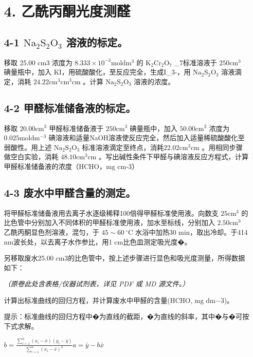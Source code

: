 \section*{4. 乙酰丙酮光度测醛}
\subsection*{4-1 $\mathrm { N a _ { 2 } S _ { 2 } O _ { 3 } }$ 溶液的标定。}

移取 25.00 cm3 浓度为 $8 . 3 3 3 \times 1 0 ^ { - 3 } \mathrm { m o l d m ^ { 3 } }$ 的 $\mathrm { K _ { 2 } C r _ { 2 } O _ { 7 } }$ _{7}标准溶液于 $2 5 0 \mathrm { c m } ^ { 3 }$ 碘量瓶中，加⼊ KI，⽤硫酸酸化，⾄反应完全，⽣成I_{3}-，⽤ $\mathrm { N a _ { 2 } S _ { 2 } O _ { 3 } }$ 溶液滴定，消耗 $2 4 . 2 2 \mathrm { c m } ^ { 3 } \mathrm { c m } ^ { 3 } \mathrm { c m } $ 。计算 $\mathrm { N a _ { 2 } S _ { 2 } O _ { 3 } }$ 溶液的浓度。

\subsection*{4-2 甲醛标准储备液的标定。}

移取 $2 0 . 0 0 \mathrm { c m } ^ { 3 }$ 甲醛标准储备液于 $2 5 0 \mathrm { c m } ^ { 3 }$ 碘量瓶中，加⼊ $5 0 . 0 0 \mathrm { c m } ^ { 3 }$ 浓度为 $0 . 0 2 5 \mathrm { m o l d m ^ { - 3 } }$ 碘溶液和适量NaOH溶液使反应完全，然后加⼊适量稀硫酸酸化⾄弱酸性。⽤上述 $\mathrm { N a _ { 2 } S _ { 2 } O _ { 3 } }$ 标准溶液滴定⾄终点，消耗$2 2 . 0 2 \mathrm { c m } ^ { 3 } \mathrm { c m }$ 。⽤相同步骤做空⽩实验，消耗 $4 8 . 1 0 \mathrm { c m } ^ { 3 } \mathrm { c m }$ 。写出碱性条件下甲醛与碘溶液反应⽅程式，计算甲醛标准储备液的浓度（HCHO，mg cm-3）

\subsection*{4-3 废⽔中甲醛含量的测定。}

将甲醛标准储备液⽤去离⼦⽔逐级稀释100倍得甲醛标准使⽤液。向数⽀ $2 5 \mathrm { c m ^ { 3 } }$ 的⽐⾊管中分别加⼊不同体积的甲醛标准使⽤液，加⽔⾄标线，分别加⼊ $2 . 5 0 \mathrm { c m } ^ { 3 }$ ⼄酰丙酮显⾊剂溶液，混匀，于 $4 5 { \sim } 6 0 ~ ^ { \circ } \mathrm { C }$ ⽔浴中加热30 min，取出冷却。于414 nm波⻓处，以去离⼦⽔作参⽐，⽤1 cm⽐⾊⽫测定吸光度�。

另移取废⽔25.00 cm3的⽐⾊管中，按上述步骤进⾏显⾊和吸光度测量，所得数据如下：

\textit{（原卷此处含表格/仪器试剂表，详见 PDF 或 MD 源文件。）}

计算出标准曲线的回归⽅程，并计算废⽔中甲醛的含量(HCHO, mg dm−3)。

提⽰：标准曲线的回归⽅程中�为直线的截距，�为直线的斜率，其中�与�可按下式求解。

$
b = \frac {\sum_ {i = 1} ^ {n} (x _ {i} - \bar {x}) (y _ {i} - \bar {y})}{\sum_ {i = 1} ^ {n} (x _ {i} - \bar {x}) ^ {2}} a = \bar {y} - b \bar {x}
$
